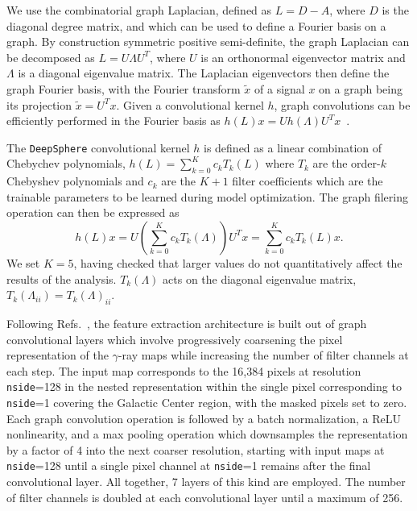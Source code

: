 \documentclass[prd,aps,10pt,nofootinbib,twocolumn,superscriptaddress,preprintnumbers,balancelastpage,longbibliography]{revtex4-1}
\begin{document}
We use the combinatorial graph Laplacian, defined as $ L =  D -  A$, where $ D$ is the diagonal degree matrix, and which can be used to define a Fourier basis on a graph. By construction symmetric positive semi-definite, the graph Laplacian can be decomposed as $ L =  U  \Lambda  U^T$, where $ U$ is an orthonormal eigenvector matrix and $ \Lambda$ is a diagonal eigenvalue matrix. The Laplacian eigenvectors then define the graph Fourier basis, with the Fourier transform $\tilde{ x}$ of a signal $ x$ on a graph being its projection $\tilde{x} =  U^T  x$.
Given a convolutional kernel $h$, graph convolutions can be efficiently performed in the Fourier basis as $h({L}) {x}={U} h({\Lambda}) {U}^{T} {x}$~\cite{defferrard2016convolutional}.

The \texttt{DeepSphere} convolutional kernel $h$ is defined as a linear combination of Chebychev polynomials, $h({{L}}) = \sum_{k=0}^{K} c_{k} T_{k}({{L}})$ where $T_k$ are the order-$k$ Chebyshev polynomials and $c_k$ are the $K + 1$ filter coefficients which are the trainable parameters to be learned during model optimization. The graph filering operation can then be expressed as
\begin{equation}
h({L}) {x}={U}\left(\sum_{k=0}^{K} c_{k} T_k({\Lambda})\right) {U}^{T} {x}=\sum_{k=0}^{K} c_{k} T_k({L}) {x}.
\end{equation}
We set $K=5$, having checked that larger values do not quantitatively affect the results of the analysis. $T_k({\Lambda})$ acts on the diagonal eigenvalue matrix, $T_k({\Lambda_{ii}}) = T_k({\Lambda})_{ii}$. 

Following Refs.~\cite{Perraudin:2018rbt,List:2020mzd}, the feature extraction architecture is built out of graph convolutional layers which involve progressively coarsening the pixel representation of the $\gamma$-ray maps while increasing the number of filter channels at each step. The input map corresponds to the 16,384 pixels at \HEALPix resolution \texttt{nside}=128 in the nested representation within the single pixel corresponding to \texttt{nside}=1 covering the Galactic Center region, with the masked pixels set to zero. Each graph convolution operation is followed by a batch normalization, a ReLU nonlinearity, and a max pooling operation which downsamples the representation by a factor of 4 into the next coarser \HEALPix resolution, starting with input maps at \texttt{nside}=128 until a single pixel channel at \texttt{nside}=1 remains after the final convolutional layer. All together, 7 layers of this kind are employed. The number of filter channels is doubled at each convolutional layer until a maximum of 256. 
\end{document}
